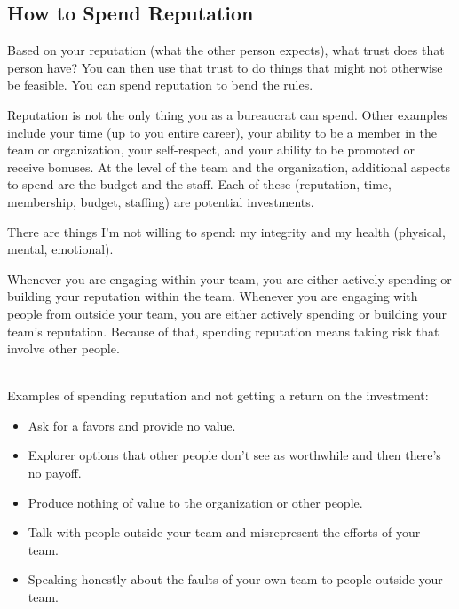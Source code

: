 \subsection*{How to Spend Reputation}

Based on your reputation (what the other person expects), what trust does that person have?  You can then use that trust to do things that might not otherwise be feasible. You can spend reputation to bend the rules. 

Reputation is not the only thing you as a bureaucrat can spend. Other examples include your time (up to you entire career), your ability to be a member in the team or organization, your self-respect, and your ability to be promoted or receive bonuses. At the level of the team and the organization, additional aspects to spend are the budget and the staff. Each of these (reputation, time, membership, budget, staffing) are potential investments. 

There are things I'm not willing to spend: my integrity and my health (physical, mental, emotional).


Whenever you are engaging within your team, you are either actively spending or building your reputation within the team.
Whenever you are engaging with people from outside your team, you are either actively spending or building your team's reputation.
Because of that, spending reputation means taking risk that involve other people.

\ \\

Examples of spending reputation and not getting a return on the investment:
\begin{itemize}
    \item Ask for a favors and provide no value.
    \item Explorer options that other people don't see as worthwhile and then there's no payoff.
    \item Produce nothing of value to the organization or other people.
    \item Talk with people outside your team and misrepresent the efforts of your team.
    \item Speaking honestly about the faults of your own team to people outside your team.
\end{itemize}












